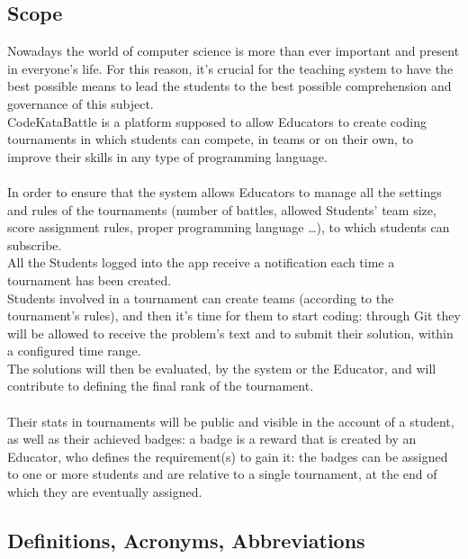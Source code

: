 \documentclass{article}
\begin{document}
\subsection{Scope}
Nowadays the world of computer science is more than ever important and present in everyone's life. For this reason, it's crucial for the teaching system to have the best
possible means to lead the students to the best possible comprehension and governance of this subject. \\
CodeKataBattle is a platform supposed to allow Educators to create coding tournaments in which students can compete, in teams or on their own, to improve their skills in any type of programming language.\\\\
In order to ensure that the system allows Educators to manage all the settings and rules of the tournaments (number of battles, allowed Students' team size, score assignment rules, proper programming language \dots), to which students can subscribe.\\
All the Students logged into the app receive a notification each time a tournament has been created.\\
Students involved in a tournament can create teams (according to the tournament's rules), and then it's time for them to start coding: through Git they will be allowed to receive the problem's text and to submit their solution, within a configured time range.\\
The solutions will then be evaluated, by the system or the Educator, and will contribute to defining the final rank of the tournament.\\\\
Their stats in tournaments will be public and visible in the account of a student, as well as their achieved badges: a badge is a reward that is created by an Educator, who defines the requirement(s) to gain it: the badges can be assigned to one or more students and are relative to a single tournament, at the end of which they are eventually assigned.

\subsection{Definitions, Acronyms, Abbreviations} 
\end{document}
